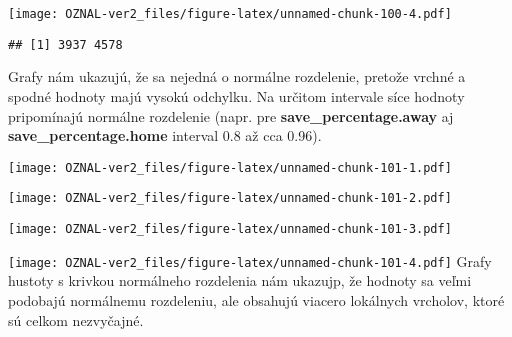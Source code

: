 \documentclass[
]{article}
\newenvironment{Shaded}{\begin{snugshade}}{\end{snugshade}}
\newcommand{\FunctionTok}[1]{\textcolor[rgb]{0.00,0.00,0.00}{#1}}
\newcommand{\NormalTok}[1]{#1}
\newcommand{\SpecialCharTok}[1]{\textcolor[rgb]{0.00,0.00,0.00}{#1}}
\begin{document}
\texttt{[image: OZNAL-ver2\_files/figure-latex/unnamed-chunk-100-4.pdf]}

\begin{verbatim}
## [1] 3937 4578
\end{verbatim}

Grafy nám ukazujú, že sa nejedná o normálne rozdelenie, pretože vrchné a
spodné hodnoty majú vysokú odchylku. Na určitom intervale síce hodnoty
pripomínajú normálne rozdelenie (napr. pre
\textbf{save\_percentage.away} aj \textbf{save\_percentage.home}
interval 0.8 až cca 0.96).

\begin{Shaded}
\end{Shaded}

\texttt{[image: OZNAL-ver2\_files/figure-latex/unnamed-chunk-101-1.pdf]}

\begin{Shaded}
\end{Shaded}

\texttt{[image: OZNAL-ver2\_files/figure-latex/unnamed-chunk-101-2.pdf]}

\begin{Shaded}
\end{Shaded}

\texttt{[image: OZNAL-ver2\_files/figure-latex/unnamed-chunk-101-3.pdf]}

\begin{Shaded}
\end{Shaded}

\texttt{[image: OZNAL-ver2\_files/figure-latex/unnamed-chunk-101-4.pdf]}
Grafy hustoty s krivkou normálneho rozdelenia nám ukazujp, že hodnoty sa
veľmi podobajú normálnemu rozdeleniu, ale obsahujú viacero lokálnych
vrcholov, ktoré sú celkom nezvyčajné.
\end{document}
